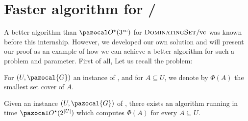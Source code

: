 \section{Faster algorithm for /\vc}
\label{section:domset-vc}

A better algorithm than $\O^\star(3^\vc)$ for $\textsc{DominatingSet}/\text{vc}$ was known before this internship. However, we developed our own solution and will present our proof as an example of how we can achieve a better algorithm for such a problem and parameter. First of all, Let us recall the  problem:

\begin{problem}
\end{problem}

For $(U, \pazocal{G})$ an instance of , and for $A \subseteq U$, we denote by $\Phi(A)$ the smallest set cover of $A$.

\begin{lemma}
    \label{lemma:set-cover}
    Given an instance $(U, \pazocal{G})$ of , there exists an algorithm running in time $\O^\star(2^{|U|})$ which computes $\Phi(A)$ for every $A \subseteq U$.
\end{lemma}

